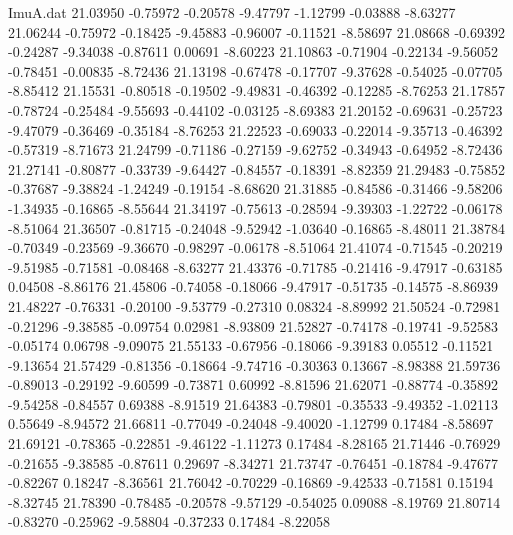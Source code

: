 \begin{filecontents}{ImuA.dat}
  21.03950   -0.75972   -0.20578   -9.47797   -1.12799   -0.03888   -8.63277
  21.06244   -0.75972   -0.18425   -9.45883   -0.96007   -0.11521   -8.58697
  21.08668   -0.69392   -0.24287   -9.34038   -0.87611    0.00691   -8.60223
  21.10863   -0.71904   -0.22134   -9.56052   -0.78451   -0.00835   -8.72436
  21.13198   -0.67478   -0.17707   -9.37628   -0.54025   -0.07705   -8.85412
  21.15531   -0.80518   -0.19502   -9.49831   -0.46392   -0.12285   -8.76253
  21.17857   -0.78724   -0.25484   -9.55693   -0.44102   -0.03125   -8.69383
  21.20152   -0.69631   -0.25723   -9.47079   -0.36469   -0.35184   -8.76253
  21.22523   -0.69033   -0.22014   -9.35713   -0.46392   -0.57319   -8.71673
  21.24799   -0.71186   -0.27159   -9.62752   -0.34943   -0.64952   -8.72436
  21.27141   -0.80877   -0.33739   -9.64427   -0.84557   -0.18391   -8.82359
  21.29483   -0.75852   -0.37687   -9.38824   -1.24249   -0.19154   -8.68620
  21.31885   -0.84586   -0.31466   -9.58206   -1.34935   -0.16865   -8.55644
  21.34197   -0.75613   -0.28594   -9.39303   -1.22722   -0.06178   -8.51064
  21.36507   -0.81715   -0.24048   -9.52942   -1.03640   -0.16865   -8.48011
  21.38784   -0.70349   -0.23569   -9.36670   -0.98297   -0.06178   -8.51064
  21.41074   -0.71545   -0.20219   -9.51985   -0.71581   -0.08468   -8.63277
  21.43376   -0.71785   -0.21416   -9.47917   -0.63185    0.04508   -8.86176
  21.45806   -0.74058   -0.18066   -9.47917   -0.51735   -0.14575   -8.86939
  21.48227   -0.76331   -0.20100   -9.53779   -0.27310    0.08324   -8.89992
  21.50524   -0.72981   -0.21296   -9.38585   -0.09754    0.02981   -8.93809
  21.52827   -0.74178   -0.19741   -9.52583   -0.05174    0.06798   -9.09075
  21.55133   -0.67956   -0.18066   -9.39183    0.05512   -0.11521   -9.13654
  21.57429   -0.81356   -0.18664   -9.74716   -0.30363    0.13667   -8.98388
  21.59736   -0.89013   -0.29192   -9.60599   -0.73871    0.60992   -8.81596
  21.62071   -0.88774   -0.35892   -9.54258   -0.84557    0.69388   -8.91519
  21.64383   -0.79801   -0.35533   -9.49352   -1.02113    0.55649   -8.94572
  21.66811   -0.77049   -0.24048   -9.40020   -1.12799    0.17484   -8.58697
  21.69121   -0.78365   -0.22851   -9.46122   -1.11273    0.17484   -8.28165
  21.71446   -0.76929   -0.21655   -9.38585   -0.87611    0.29697   -8.34271
  21.73747   -0.76451   -0.18784   -9.47677   -0.82267    0.18247   -8.36561
  21.76042   -0.70229   -0.16869   -9.42533   -0.71581    0.15194   -8.32745
  21.78390   -0.78485   -0.20578   -9.57129   -0.54025    0.09088   -8.19769
  21.80714   -0.83270   -0.25962   -9.58804   -0.37233    0.17484   -8.22058

\end{filecontents}
